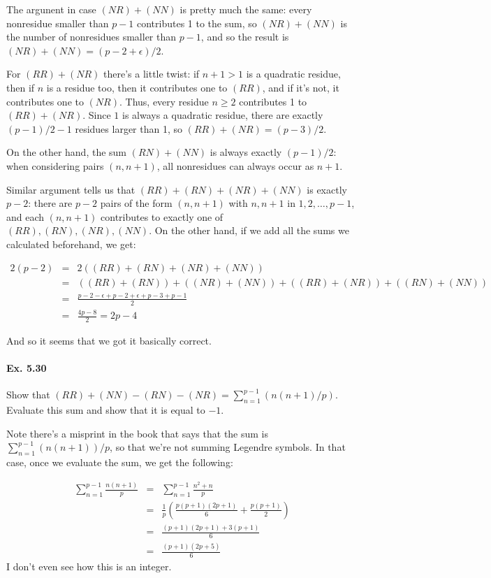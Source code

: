 \documentclass[notitlepage]{article}
\theoremstyle{definition}
\begin{document}
The argunent in case $(NR) + (NN)$ is pretty much the same: every
nonresidue smaller than $p-1$ contributes 1 to the sum, so $(NR) +
(NN)$ is the number of nonresidues smaller than $p-1$, and so the
result is $(NR) + (NN) = (p-2+\epsilon)/2$.

For $(RR) + (NR)$ there's a little twist: if $n+1 > 1$ is a quadratic
residue, then if $n$ is a residue too, then it contributes one to
$(RR)$, and if it's not, it contributes one to $(NR)$. Thus, every
residue $n \geq 2$ contributes 1 to $(RR) + (NR)$. Since $1$ is always
a quadratic residue, there are exactly $(p-1)/2 - 1$ residues larger
than 1, so $(RR) + (NR) = (p-3)/2$.

On the other hand, the sum $(RN) + (NN)$ is always exactly $(p-1)/2$:
when considering pairs $(n, n+1)$, all nonresidues can always occur as
$n+1$.

Similar argument tells us that $(RR) + (RN) + (NR) + (NN)$ is exactly
$p-2$: there are $p-2$ pairs of the form $(n, n+1)$ with $n, n+1$ in
$1, 2, \ldots, p-1$, and each $(n, n+1)$ contributes to exactly one of
$(RR), (RN), (NR), (NN)$. On the other hand, if we add all the sums we
calculated beforehand, we get:

\begin{eqnarray}
2(p-2) &=& 2((RR) + (RN) + (NR) + (NN)) \\ &=& ((RR) + (RN)) + ((NR) +
(NN)) + ((RR) + (NR)) + ((RN) + (NN)) \\ &=& \frac{p-2 - \epsilon +
  p-2+\epsilon+p-3 + p-1}{2} \\ &=& \frac{4p - 8}{2} = 2p-4
\end{eqnarray}

And so it seems that we got it basically correct.

\paragraph{Ex. 5.30}
Show that $(RR) + (NN) - (RN) - (NR) =
\sum_{n=1}^{p-1}(n(n+1)/p)$. Evaluate this sum and show that it is
equal to $-1$.

Note there's a misprint in the book that says that the sum is
$\sum_{n=1}^{p-1} (n(n+1))/p$, so that we're not summing Legendre
symbols. In that case, once we evaluate the sum, we get the following:

\begin{eqnarray}
  \sum_{n=1}^{p-1} \frac{n(n+1)}{p} &=& \sum_{n=1}^{p-1} \frac{n^2 +
    n}{p} \\ &=& \frac{1}{p}\left(\frac{p(p+1)(2p+1)}{6} +
  \frac{p(p+1)}{2}\right) \\ &=& \frac{(p+1)(2p+1) + 3(p+1)}{6} \\ &=&
  \frac{(p+1)(2p+5)}{6}
\end{eqnarray}
I don't even see how this is an integer.
\end{document}
